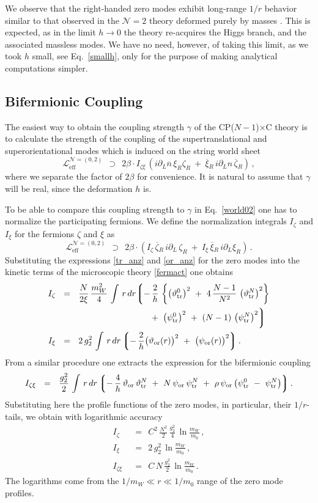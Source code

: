 \documentclass[12pt]{article}
\def\beq{\begin{equation}}
\def\eeq{\end{equation}}
\newcommand{\ntwo}{${\mathcal N}=2$ }
\newcommand{\p}{\partial}
\newcommand{\ov}{\overline}
\newcommand{\mc}[1]{\mathcal{#1}}
\newcommand{\lgr}{\left\lgroup}
\newcommand{\rgr}{\right\rgroup}
\newcommand{\bxir}{\ov{\xi}{}_R}
\newcommand{\xir}{\xi_R}
\newcommand{\bzr}{\ov{\zeta}{}_R}
\newcommand{\zr}{\zeta_R}
\newcommand{\nbar}{\ov{n}}
\newcommand{\pts}{\psi_{\rm tr}^0}
\newcommand{\ptN}{\psi_{\rm tr}^N}
\newcommand{\tts}{\vartheta_{\rm tr}^0}
\newcommand{\ttN}{\vartheta_{\rm tr}^N}
\newcommand{\tor}{\vartheta_{\rm or}}
\newcommand{\por}{\psi_{\rm or}}
\newcommand{\CPC}{CP($N-1$)$\times$C }
\begin{document}
We observe that the right-handed zero modes exhibit long-range $1/r$ behavior similar to that observed
in the \ntwo theory deformed purely by masses \cite{GSYmmodel,SYhet}. 
This is expected, as in the limit $ h \to 0 $ the theory re-acquires the Higgs branch, and the associated
massless modes. 
We have no need, however, of taking this limit, as we took $ h $ small, 
see Eq.~\eqref{smallh}, only for the purpose of making analytical computations simpler.

\subsection{Bifermionic Coupling}

The easiest way to obtain the coupling strength $ \gamma $ of the \CPC theory
is to calculate the strength of the coupling of the supertranslational and superorientational
modes which is induced on the string world sheet
\beq
\label{bif_norm}
	\mc{L}_\text{eff}^{\mc{N}=(0,2)} ~~\supset~~
	2\beta \cdot I_{\zeta\xi}\, ( i\p_L\nbar\,\xir\zr ~+~ \bxir\,i\p_L n\, \bzr )\,,
\eeq
where we separate the factor of $ 2\beta $ for convenience. 
It is natural to assume that $ \gamma $ will be real, since the deformation $h$ is.

To be able to compare this coupling strength to $ \gamma $ in Eq.~\eqref{world02} one has to normalize 
the participating fermions.
We define the normalization integrals $ I_\zeta $ and $ I_\xi $ for the fermions $ \zeta $ and $ \xi $ as
\beq
\label{kin_norm}
	\mc{L}_\text{eff}^{\mc{N}=(0,2)} ~~\supset~~
	2\beta \cdot ( I_\zeta\, \bzr\, i\p_L\,\zr  ~+~ I_\xi\, \bxir\, i\p_L \xir ) \,.
\eeq
Substituting the expressions \eqref{tr_anz} and \eqref{or_anz} for the zero modes into the kinetic terms
of the microscopic theory \eqref{fermact} one obtains
\begin{align*}
%
	I_\zeta & ~~=~~ \frac{N}{2\xi}\, \frac{m_W^2}{4}\, \int\, r\,dr 
		\biggl\lgroup -\, \frac{2}{h}\, 
			  \left\{ \left( \tts \right)^2 
				~+~ 4\,\frac{N-1}{N^2}\, \left( \ttN \right)^2 \right\} \\
		& \qquad\qquad\qquad\qquad\qquad~~
			~+~ \left( \pts \right)^2 ~+~ (N-1)\,\left( \ptN \right)^2  \biggr\rgroup \\
%
	I_\xi & ~~=~~ 2\,g_2^2\, \int\, r\,dr 
		\lgr -\,\frac{2}{h}\bigl( \tor(r) \bigr)^2 ~+~ \bigl( \por(r) \bigr)^2 \rgr.
\end{align*}
From a similar procedure one extracts the expression for the bifermionic coupling
\[
	I_{\zeta\xi} ~~=~~ \frac{g_2^2}{2}\, \int\, r\,dr
		\lgr -\,\frac{4}{h}\,\tor\,\ttN  ~+~ N\, \por\,\ptN  
			~+~ \rho\, \por \left( \pts ~-~ \ptN \right) \rgr.
\]
Substituting here the profile functions of the zero modes, in particular, their $ 1/r $-tails,
we obtain with logarithmic accuracy
\begin{align*}
%
	I_\zeta & ~~=~~ C^2\,\frac{N^2}{2}\,\frac{g_2^2}{4}\, \ln \frac{m_W}{m_0}\,, \\
%
	I_\xi   & ~~=~~ 2\,g_2^2\, \ln \frac{m_W}{m_0}\,, \\
%
	I_{\zeta\xi} & ~~=~~ C\,N\, \frac{g_2^2}{2}\,  \ln \frac{m_W}{m_0}\,.
\end{align*}
The logarithms come from the $ 1/m_W \ll r \ll 1/m_0 $ range of the zero mode profiles.
\end{document}
